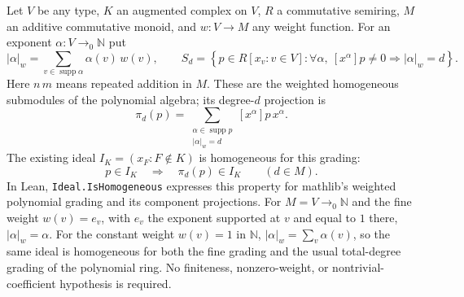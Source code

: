 \begin{lemma}\label{lem:homogeneous}
\leanok
Let $V$ be any type, $K$ an augmented complex on $V$, $R$ a commutative
semiring, $M$ an additive commutative monoid, and $w:V\to M$ any weight
function. For an exponent $\alpha:V\to_0\mathbb N$ put
\[
 |\alpha|_w=\sum_{v\in\operatorname{supp}\alpha}\alpha(v)\,w(v),
 \qquad
 S_d=\left\{p\in R[x_v:v\in V]:
   \forall\alpha,\ [x^\alpha]p\ne0\Longrightarrow |\alpha|_w=d\right\}.
\]
Here $n\,m$ means repeated addition in $M$. These are the weighted
homogeneous submodules of the polynomial algebra; its degree-$d$
projection is
\[
 \pi_d(p)=\sum_{\substack{\alpha\in\operatorname{supp}p\\|\alpha|_w=d}}
       [x^\alpha]p\,x^\alpha.
\]
The existing ideal $I_K=(x_F:F\notin K)$ is homogeneous for this grading:
\[
 p\in I_K\quad\Longrightarrow\quad\pi_d(p)\in I_K
 \qquad(d\in M).
\]
In Lean, \texttt{Ideal.IsHomogeneous} expresses this property for
mathlib's weighted polynomial grading and its component projections.
For $M=V\to_0\mathbb N$ and the fine weight $w(v)=e_v$, with $e_v$ the exponent supported at $v$
and equal to $1$ there, $|\alpha|_w=\alpha$. For the constant weight
$w(v)=1$ in $\mathbb N$, $|\alpha|_w=\sum_v\alpha(v)$, so the same ideal
is homogeneous for both the fine grading and the usual total-degree
grading of the polynomial ring. No finiteness, nonzero-weight, or
nontrivial-coefficient hypothesis is required.
\end{lemma}
